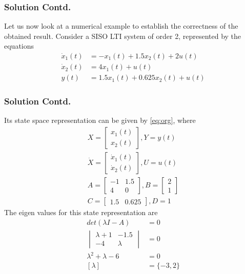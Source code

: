 \documentclass{beamer}
\begin{document}
\begin{frame}
\frametitle{Solution Contd.}
Let us now look at a numerical example to establish the correctness of the obtained result. Consider a SISO LTI system of order 2, represented by the equations
\begin{align}
    \dot x_1(t)&=-x_1(t)+1.5x_2(t)+2u(t)\\
    \dot x_2(t)&=4x_1(t)+u(t)\\
    y(t)&=1.5x_1(t)+0.625x_2(t)+u(t)
\end{align}
\end{frame}

\begin{frame}
\frametitle{Solution Contd.}
Its state space representation can be given by \eqref{eq:org}, where
\begin{align}
    X=\begin{bmatrix}
    x_1(t)\\x_2(t)
    \end{bmatrix},Y=y(t)\\
    \dot X=\begin{bmatrix}
    \dot x_1(t)\\\dot x_2(t)
    \end{bmatrix},U=u(t)\\
    A=\begin{bmatrix}
    -1 & 1.5\\
    4 & 0
    \end{bmatrix},B=\begin{bmatrix}
    2\\
    1
    \end{bmatrix}\\
    C=\begin{bmatrix}
    1.5 & 0.625
    \end{bmatrix},D=1
\end{align}
The eigen values for this state representation are
\begin{align}
    det(\lambda I-A)&=0\\
    \begin{vmatrix}
    \lambda+1 & -1.5\\
    -4 & \lambda
    \end{vmatrix}&=0\\
    \lambda^2+\lambda-6&=0\\
    [\lambda]&=\{-3,2\}
\end{align}
\end{frame}
\end{document}
